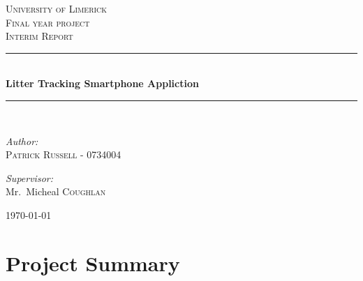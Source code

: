 \documentclass{article}
\newcommand{\HRule}{\rule{\linewidth}{0.5mm}}
\begin{document}
\begin{titlepage}

\begin{center}

   
\textsc{\LARGE University of Limerick}\\[1.5cm]

\textsc{\Large Final year project}\\[0.5cm]

\textsc{\Large Interim Report}\\[0.5cm]

\HRule \\[0.4cm]
{ \huge \bfseries Litter Tracking Smartphone Appliction}\\[0.4cm]

\HRule \\[1.5cm]

\begin{minipage}{0.4\textwidth}
\begin{flushleft} \large
\emph{Author:}\\
\textsc{Patrick Russell - 0734004}
\end{flushleft}
\end{minipage}
\begin{minipage}{0.4\textwidth}
\begin{flushright} \large
\emph{Supervisor:} \\
Mr.~Micheal \textsc{Coughlan}
\end{flushright}
\end{minipage}

\vfill

{\large \today}

\end{center}

\end{titlepage}
\newpage


\tableofcontents
\newpage


\label{sec:Summary}
\section{Project Summary}
\paragraph{}
\label{par:S Paragraph}
\end{document}
